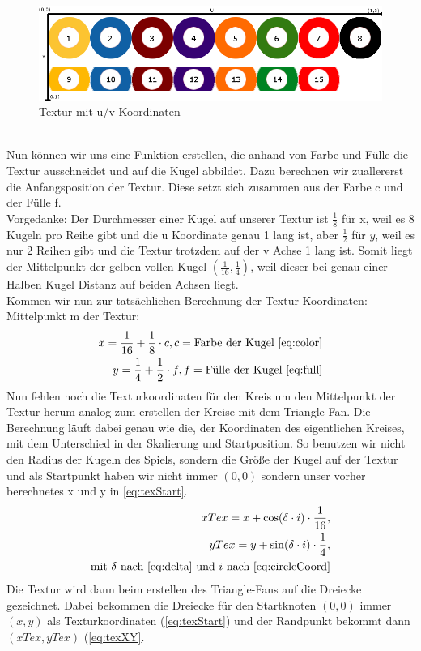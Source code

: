 	\begin{figure}[h]
		\caption{Textur mit u/v-Koordinaten}
		\includegraphics[width=\textwidth]{bilder/ballsachsen}
	\end{figure} \\
	Nun können wir uns eine Funktion erstellen, die anhand von Farbe und Fülle die Textur ausschneidet und auf die Kugel abbildet. 
	Dazu berechnen wir zuallererst die Anfangsposition der Textur. 
	Diese setzt sich zusammen aus der Farbe c und der Fülle f. \\
	Vorgedanke: Der Durchmesser einer Kugel auf unserer Textur ist $\frac{1}{8}$ für x, weil es 8 Kugeln pro Reihe gibt und die u Koordinate genau 1 lang ist, aber $\frac{1}{2}$ für $y$, weil es nur 2 Reihen gibt und die Textur trotzdem auf der v Achse 1 lang ist. 
	Somit liegt der Mittelpunkt der gelben vollen Kugel $(\frac{1}{16}, \frac{1}{4})$, weil dieser bei genau einer Halben Kugel Distanz auf beiden Achsen liegt. \\
	Kommen wir nun zur tatsächlichen Berechnung der Textur-Koordinaten: \\
	Mittelpunkt m der Textur: \\
	\begin{equation}\label{eq:texStart}
	\begin{aligned} 
		x = \frac{1}{16} + \frac{1}{8} \cdot c, c = \text{Farbe der Kugel \eqref{eq:color}} \\
		y = \frac{1}{4} + \frac{1}{2} \cdot f, f = \text{Fülle der Kugel \eqref{eq:full}}
	\end{aligned}
	\end{equation}
	Nun fehlen noch die Texturkoordinaten für den Kreis um den Mittelpunkt der Textur herum analog zum erstellen der Kreise mit dem Triangle-Fan. Die Berechnung läuft dabei genau wie die, der Koordinaten des eigentlichen Kreises, mit dem Unterschied in der Skalierung und Startposition. 
	So benutzen wir nicht den Radius der Kugeln des Spiels, sondern die Größe der Kugel auf der Textur und als Startpunkt haben wir nicht immer $(0,0)$ sondern unser vorher berechnetes x und y in \eqref{eq:texStart}. 
	\begin{equation}\label{eq:texXY}
	\begin{aligned}
		 xTex =  x + \cos(\delta \cdot i) \cdot \frac{1}{16}, \\
		 yTex =  y + \sin(\delta \cdot i) \cdot \frac{1}{4}, \\
		\text{mit } \delta \text{ nach }\eqref{eq:delta} \text{ und } i \text{ nach } \eqref{eq:circleCoord}
	\end{aligned}
	\end{equation}
	Die Textur wird dann beim erstellen des Triangle-Fans auf die Dreiecke gezeichnet. Dabei bekommen die Dreiecke für den Startknoten $(0,0)$ immer $(x,y)$ als Texturkoordinaten (\eqref{eq:texStart}) und der Randpunkt bekommt dann $(xTex,yTex)$ (\eqref{eq:texXY}.
